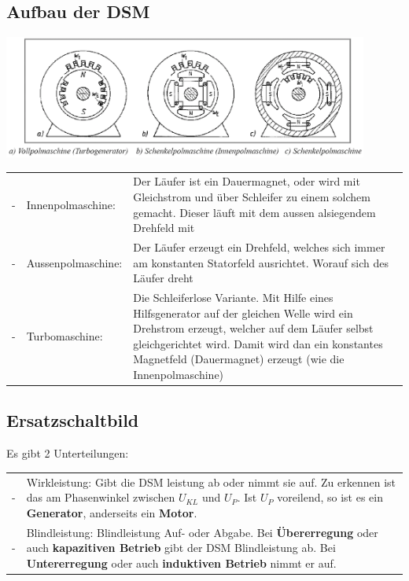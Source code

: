 	\subsection{Aufbau der DSM}
		\includegraphics[width=12cm]{./Bilder/Aufbau_DSM.png}\\
		\begin{tabular}{ p{1cm} p{4cm} p{10cm}}
			- & Innenpolmaschine: & Der Läufer ist ein Dauermagnet, oder wird mit
			Gleichstrom und über Schleifer zu einem solchem gemacht. Dieser läuft mit dem aussen
			alsiegendem Drehfeld mit\\
			- & Aussenpolmaschine: & Der Läufer erzeugt ein Drehfeld, welches sich immer
			am konstanten Statorfeld ausrichtet. Worauf sich des Läufer dreht\\
			- & Turbomaschine: & Die Schleiferlose Variante. Mit Hilfe eines
			Hilfsgenerator auf der gleichen Welle wird ein Drehstrom erzeugt, welcher
			auf dem Läufer selbst gleichgerichtet wird. Damit wird dan ein konstantes
			Magnetfeld (Dauermagnet) erzeugt (wie die Innenpolmaschine)\\
		\end{tabular}
	\subsection{Ersatzschaltbild}
		\begin{minipage}{11cm}
			Es gibt 2 Unterteilungen:\\
			\begin{tabular}{p{1cm} p{9cm}}
			    -& Wirkleistung: Gibt die DSM leistung ab oder nimmt sie auf. Zu erkennen
			    ist das am Phasenwinkel zwischen $U_{KL}$ und $U_P$. Ist $U_P$ voreilend, so ist
				es ein \textbf{Generator}, anderseits ein \textbf{Motor}.\\
				-& Blindleistung: Blindleistung Auf- oder Abgabe. Bei
				\textbf{Übererregung} oder auch \textbf{kapazitiven Betrieb} gibt der
				DSM Blindleistung ab. Bei \textbf{Untererregung} oder auch \textbf{induktiven Betrieb} nimmt er auf.\\
			\end{tabular}
	    \end{minipage}
		\begin{minipage}{8cm}
	    \end{minipage}\\
	
